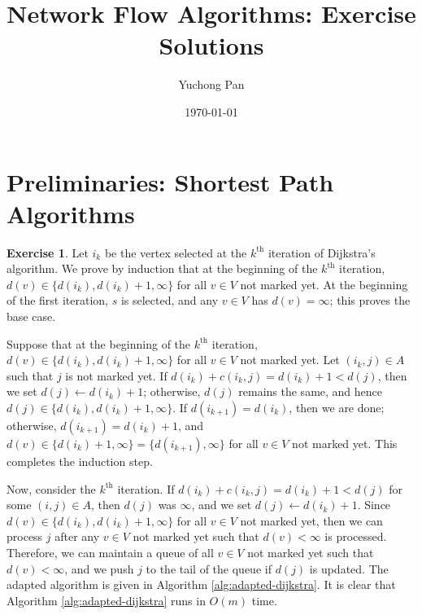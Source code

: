 \documentclass[letterpaper,reqno,12pt]{article}
\begin{document}
\title{Network Flow Algorithms: Exercise Solutions}
\author{Yuchong Pan}
\date{\today}
\newtheorem{theorem}{Theorem}
\newtheorem{lemma}{Lemma}
\newtheorem{claim}{Claim}
\theoremstyle{definition} \newtheorem{exercise}{Exercise} [section]
\theoremstyle{definition} \newtheorem{defn}{Definition}
\maketitle
%

\section{Preliminaries: Shortest Path Algorithms}

\begin{exercise}
  Let $i_k$ be the vertex selected at the $k^\text{th}$ iteration of Dijkstra's algorithm. We prove by induction that at the beginning of the $k^\text{th}$ iteration, $d(v) \in \{ d(i_k), d(i_k) + 1, \infty \}$ for all $v \in V$ not marked yet. At the beginning of the first iteration, $s$ is selected, and any $v \in V$ has $d(v) = \infty$; this proves the base case.
  
  Suppose that at the beginning of the $k^\text{th}$ iteration, $d(v) \in \{ d(i_k), d(i_k) + 1, \infty \}$ for all $v \in V$ not marked yet. Let $(i_k, j) \in A$ such that $j$ is not marked yet. If $d(i_k) + c(i_k, j) = d(i_k) + 1 < d(j)$, then we set $d(j) \leftarrow d(i_k) + 1$; otherwise, $d(j)$ remains the same, and hence $d(j) \in \{ d(i_k), d(i_k) + 1, \infty \}$. If $d(i_{k + 1}) = d(i_k)$, then we are done; otherwise, $d(i_{k + 1}) = d(i_k) + 1$, and $d(v) \in \{ d(i_k) + 1, \infty \} = \{ d(i_{k + 1}), \infty \}$ for all $v \in V$ not marked yet. This completes the induction step.

  Now, consider the $k^\text{th}$ iteration. If $d(i_k) + c(i_k, j) = d(i_k) + 1 < d(j)$ for some $(i, j) \in A$, then $d(j)$ was $\infty$, and we set $d(j) \leftarrow d(i_k) + 1$. Since $d(v) \in \{ d(i_k), d(i_k) + 1, \infty \}$ for all $v \in V$ not marked yet, then we can process $j$ after any $v \in V$ not marked yet such that $d(v) < \infty$ is processed. Therefore, we can maintain a queue of all $v \in V$ not marked yet such that $d(v) < \infty$, and we push $j$ to the tail of the queue if $d(j)$ is updated. The adapted algorithm is given in Algorithm \ref{alg:adapted-dijkstra}. It is clear that Algorithm \ref{alg:adapted-dijkstra} runs in $O(m)$ time.


\end{exercise}
\end{document}
